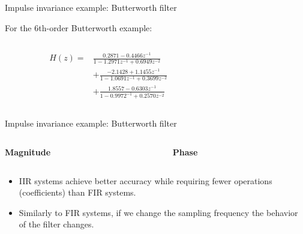 \documentclass[10pt, handout]{beamer}
\begin{document}
%
\begin{frame}{Impulse invariance example: Butterworth filter}

For the 6th-order Butterworth example:

\begin{columns}
	\begin{column}{0.5\textwidth}
		\begin{align*}
		H(z) =& \frac{0.2871 -0.4466z^{-1}}{1 -1.2971z^{-1} + 0.6949z^{-2}} \\ &+\frac{-2.1428 +1.1455z^{-1}}{1 -1.0691z^{-1} + 0.3699z^{-2}}  \\
		&+\frac{1.8557 - 0.6303z^{-1}}{1 -0.9972^{-1} + 0.2570z^{-2}} 
		\end{align*}
	\end{column}
	
	\begin{column}{0.5\textwidth}
		\begin{center}
			\resizebox{\linewidth}{!}{}
		\end{center}
	\end{column}
\end{columns}
\end{frame}

%
\begin{frame}{Impulse invariance example: Butterworth filter}

\begin{columns}
	\begin{column}{0.5\textwidth}
		\textbf{Magnitude}
		\begin{center}
			\resizebox{\linewidth}{!}{}
		\end{center}
	\end{column}
	\begin{column}{0.5\textwidth}
		\textbf{Phase}
		\begin{center}
			\resizebox{\linewidth}{!}{}
		\end{center}
	\end{column}
\end{columns}

\begin{itemize}
	\item IIR systems achieve better accuracy while requiring fewer operations (coefficients) than FIR systems.
	\item Similarly to FIR systems, if we change the sampling frequency the behavior of the filter changes.
\end{itemize}
\end{frame}
\end{document}
